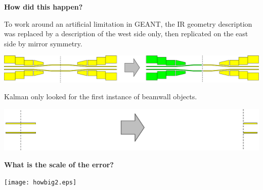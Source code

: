 
\begin{slide*}

\slideframe{}
\huge
{}
\Large

\begin{minipage}[t]{\linewidth}

\vspace{0.5cm}

{\huge \bf How did this happen?}

To work around an artificial limitation in GEANT, the IR geometry
description was replaced by a description of the west side only, then
replicated on the east side by mirror symmetry.

\vspace{0.1cm}
\begin{center}\includegraphics[width=\linewidth]{change_IRGeom.eps}\end{center}
\vspace{0.1cm}

Kalman only looked for the first instance of beamwall objects.

\vspace{0.1cm}
\begin{center}\includegraphics[width=\linewidth]{change_IRGeom2.eps}\end{center}

\vspace{0.5cm}

{\huge \bf What is the scale of the error?}

\begin{center}\texttt{[image: howbig2.eps]}\end{center}

\end{minipage}

\end{slide*}


